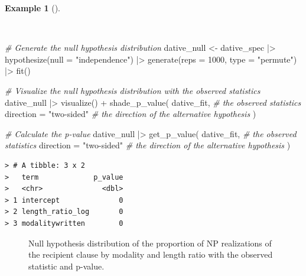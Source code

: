\documentclass[
  letterpaper,
  DIV=11,
  numbers=noendperiod]{scrreprt}
\newenvironment{Shaded}{\begin{snugshade}}{\end{snugshade}}
\newcommand{\AttributeTok}[1]{\textcolor[rgb]{0.00,0.00,0.00}{#1}}
\newcommand{\CommentTok}[1]{\textcolor[rgb]{0.00,0.00,0.00}{\textit{#1}}}
\newcommand{\DecValTok}[1]{\textcolor[rgb]{0.00,0.00,0.00}{#1}}
\newcommand{\FunctionTok}[1]{\textcolor[rgb]{0.00,0.00,0.00}{#1}}
\newcommand{\NormalTok}[1]{\textcolor[rgb]{0.00,0.00,0.00}{#1}}
\newcommand{\OtherTok}[1]{\textcolor[rgb]{0.00,0.00,0.00}{#1}}
\newcommand{\SpecialCharTok}[1]{\textcolor[rgb]{0.00,0.00,0.00}{#1}}
\newcommand{\StringTok}[1]{\textcolor[rgb]{0.00,0.00,0.00}{#1}}
\theoremstyle{definition}
\newtheorem{example}{Example}[chapter]
\theoremstyle{remark}
\begin{document}
\begin{example}[]\protect\hypertarget{exm-ida-cat-null-hypothesis-logistic-regression}{}\label{exm-ida-cat-null-hypothesis-logistic-regression}

~

\begin{Shaded}
\begin{Highlighting}[]
\CommentTok{\# Generate the null hypothesis distribution}
\NormalTok{dative\_null }\OtherTok{\textless{}{-}}
\NormalTok{  dative\_spec }\SpecialCharTok{|\textgreater{}}
  \FunctionTok{hypothesize}\NormalTok{(}\AttributeTok{null =} \StringTok{"independence"}\NormalTok{) }\SpecialCharTok{|\textgreater{}}
  \FunctionTok{generate}\NormalTok{(}\AttributeTok{reps =} \DecValTok{1000}\NormalTok{, }\AttributeTok{type =} \StringTok{"permute"}\NormalTok{) }\SpecialCharTok{|\textgreater{}}
  \FunctionTok{fit}\NormalTok{()}

\CommentTok{\# Visualize the null hypothesis distribution with the observed statistics}
\NormalTok{dative\_null }\SpecialCharTok{|\textgreater{}}
  \FunctionTok{visualize}\NormalTok{() }\SpecialCharTok{+}
  \FunctionTok{shade\_p\_value}\NormalTok{(}
\NormalTok{    dative\_fit, }\CommentTok{\# the observed statistics}
    \AttributeTok{direction =} \StringTok{"two{-}sided"} \CommentTok{\# the direction of the alternative hypothesis}
\NormalTok{  )}

\CommentTok{\# Calculate the p{-}value}
\NormalTok{dative\_null }\SpecialCharTok{|\textgreater{}}
  \FunctionTok{get\_p\_value}\NormalTok{(}
\NormalTok{    dative\_fit, }\CommentTok{\# the observed statistics}
    \AttributeTok{direction =} \StringTok{"two{-}sided"} \CommentTok{\# the direction of the alternative hypothesis}
\NormalTok{  )}
\end{Highlighting}
\end{Shaded}

\begin{verbatim}
> # A tibble: 3 x 2
>   term             p_value
>   <chr>              <dbl>
> 1 intercept              0
> 2 length_ratio_log       0
> 3 modalitywritten        0
\end{verbatim}

\begin{figure}[H]


\caption{\label{fig-ida-cat-null-hypothesis-logistic-regression}Null
hypothesis distribution of the proportion of NP realizations of the
recipient clause by modality and length ratio with the observed
statistic and p-value.}

\end{figure}%

\end{example}
\end{document}
